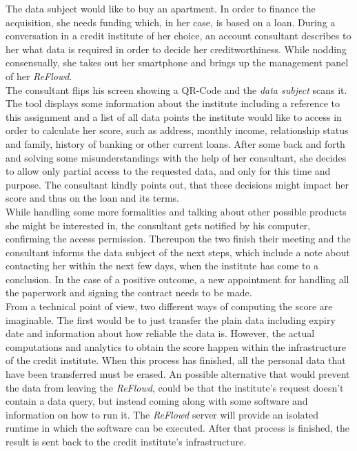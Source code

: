 \documentclass[12pt,english,a4paper,titlepage,cleardoublepage=empty,dottedtoc]{report}
\begin{document}
The data subject would like to buy an apartment. In order to finance the
acquisition, she needs funding which, in her case, is based on a loan.
During a conversation in a credit institute of her choice, an account
consultant describes to her what data is required in order to decide her
creditworthiness. While nodding consensually, she takes out her
smartphone and brings up the management panel of her \emph{ReFlowd}.\\
The consultant flips his screen showing a QR-Code and the \emph{data
subject} scans it. The tool displays some information about the
institute including a reference to this assignment and a list of all
data points the institute would like to access in order to calculate her
score, such as address, monthly income, relationship status and family,
history of banking or other current loans. After some back and forth and
solving some misunderstandings with the help of her consultant, she
decides to allow only partial access to the requested data, and only for
this time and purpose. The consultant kindly points out, that these
decisions might impact her score and thus on the loan and its terms.\\
While handling some more formalities and talking about other possible
products she might be interested in, the consultant gets notified by his
computer, confirming the access permission. Thereupon the two finish
their meeting and the consultant informs the data subject of the next
steps, which include a note about contacting her within the next few
days, when the institute has come to a conclusion. In the case of a
positive outcome, a new appointment for handling all the paperwork and
signing the contract needs to be made.\\
From a technical point of view, two different ways of computing the
score are imaginable. The first would be to just transfer the plain data
including expiry date and information about how reliable the data is.
However, the actual computations and analytics to obtain the score
happen within the infrastructure of the credit institute. When this
process has finished, all the personal data that have been transferred
must be erased. An possible alternative that would prevent the data from
leaving the \emph{ReFlowd}, could be that the institute's request
doesn't contain a data query, but instead coming along with some
software and information on how to run it. The \emph{ReFlowd} server
will provide an isolated runtime in which the software can be executed.
After that process is finished, the result is sent back to the credit
institute's infrastructure.
\end{document}
